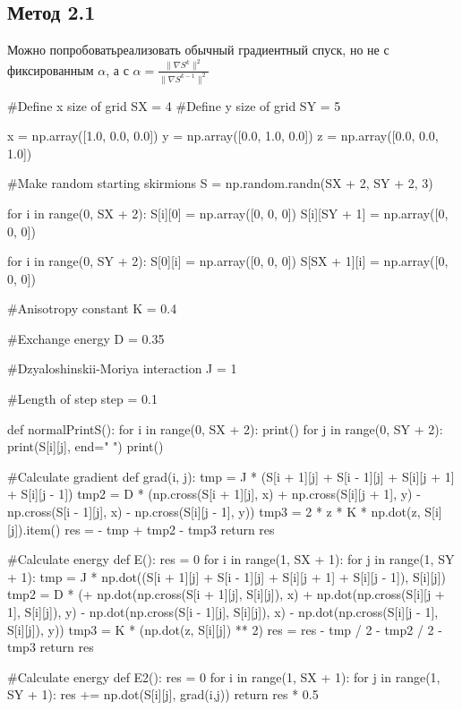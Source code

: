 \documentclass[ 12pt,x11names]{article}
\begin{document}
 \subsection{Метод 2.1}
 Можно попробоватьреализовать обычный градиентный спуск, но не с фиксированным $\alpha$, а с $\alpha = \frac{\| \nabla S^k \|^2}{\| \nabla S^{k-1} \|^2}$\\
  \begin{python}
#Define  x size of grid
SX = 4
#Define y size of grid
SY = 5

x = np.array([1.0, 0.0, 0.0])
y = np.array([0.0, 1.0, 0.0])
z = np.array([0.0, 0.0, 1.0])

#Make random starting skirmions
S = np.random.randn(SX + 2, SY + 2, 3)

for i in range(0, SX + 2):
    S[i][0] = np.array([0, 0, 0])
    S[i][SY + 1] = np.array([0, 0, 0])

for i in range(0, SY + 2):
    S[0][i] = np.array([0, 0, 0])
    S[SX + 1][i] = np.array([0, 0, 0])

#Anisotropy constant
K = 0.4

#Exchange energy
D = 0.35

#Dzyaloshinskii-Moriya interaction
J = 1

#Length of step
step = 0.1

def normalPrintS():
    for i in range(0, SX + 2):
        print()
        for j in range(0, SY + 2):
            print(S[i][j], end=" ")
    print()

#Calculate gradient
def grad(i, j):
    tmp = J * (S[i + 1][j] + S[i - 1][j] + S[i][j + 1] + S[i][j - 1])
    tmp2 = D * (np.cross(S[i + 1][j], x) + np.cross(S[i][j + 1], y) - np.cross(S[i - 1][j], x) - np.cross(S[i][j - 1], y))
    tmp3 = 2 * z * K * np.dot(z, S[i][j]).item()
    res = - tmp + tmp2 - tmp3
    return res

#Calculate energy
def E():
    res = 0
    for i in range(1, SX + 1):
        for j in range(1, SY + 1):
            tmp = J * np.dot((S[i + 1][j] + S[i - 1][j] + S[i][j + 1] + S[i][j - 1]), S[i][j])
            tmp2 = D * (+ np.dot(np.cross(S[i + 1][j], S[i][j]), x)
                        + np.dot(np.cross(S[i][j + 1], S[i][j]), y)
                        - np.dot(np.cross(S[i - 1][j], S[i][j]), x)
                        - np.dot(np.cross(S[i][j - 1], S[i][j]), y))
            tmp3 = K * (np.dot(z, S[i][j]) ** 2)
            res = res - tmp / 2 - tmp2 / 2 - tmp3
    return res

#Calculate energy
def E2():
    res = 0
    for i in range(1, SX + 1):
        for j in range(1, SY + 1):
            res += np.dot(S[i][j], grad(i,j))
    return res * 0.5


\end{python}
\end{document}
